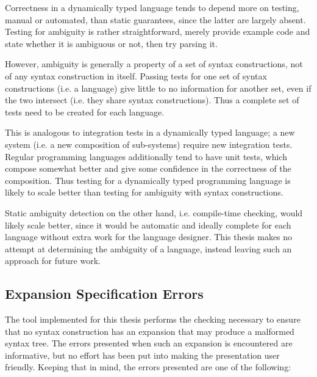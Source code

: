 \documentclass{kththesis}
\begin{document}
Correctness in a dynamically typed language tends to depend more on testing, manual or automated, than static guarantees, since the latter are largely absent. Testing for ambiguity is rather straightforward, merely provide example code and state whether it is ambiguous or not, then try parsing it.

However, ambiguity is generally a property of a set of syntax constructions, not of any syntax construction in itself. Passing tests for one set of syntax constructions (i.e. a language) give little to no information for another set, even if the two intersect (i.e. they share syntax constructions). Thus a complete set of tests need to be created for each language.

This is analogous to integration tests in a dynamically typed language; a new system (i.e. a new composition of sub-systems) require new integration tests. Regular programming languages additionally tend to have unit tests, which compose somewhat better and give some confidence in the correctness of the composition. Thus testing for a dynamically typed programming language is likely to scale better than testing for ambiguity with syntax constructions.

Static ambiguity detection on the other hand, i.e. compile-time checking, would likely scale better, since it would be automatic and ideally complete for each language without extra work for the language designer. This thesis makes no attempt at determining the ambiguity of a language, instead leaving such an approach for future work.

\subsection{Expansion Specification Errors}

The tool implemented for this thesis performs the checking necessary to ensure that no syntax construction has an expansion that may produce a malformed syntax tree. The errors presented when such an expansion is encountered are informative, but no effort has been put into making the presentation user friendly. Keeping that in mind, the errors presented are one of the following:
\end{document}

